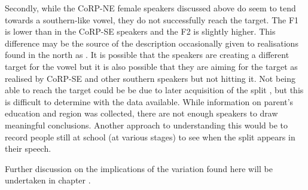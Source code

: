 \documentclass[../../../00.FullDoc/tex/ThesisSkeleton-draft2]{subfiles}
\begin{document}
Secondly, while the CoRP-NE female speakers discussed above do seem to tend towards a southern-like \strutt{} vowel, they do not successfully reach the target. The F1 is lower than in the CoRP-SE speakers and the F2 is slightly higher. This difference may be the source of the description occasionally given to \strutt{} realisations found in the north as  \citep{Braber2015,Jansen2020}. It is possible that the speakers are creating a different target for the \strutt{} vowel but it is also possible that they are aiming for the target as realised by CoRP-SE and other southern speakers but not hitting it. Not being able to reach the target could be be due to later acquisition of the split \citep{Evans2007} , but this is difficult to determine with the data available. While information on parent's education and region was collected, there are not enough speakers to draw meaningful conclusions. Another approach to understanding this would be to record people still at school (at various stages) to see when the \FS{} split appears in their speech.

Further discussion on the implications of the variation found here will be undertaken in chapter \notinsubfile{\ref{ch:Discussion}}.




\end{document}
